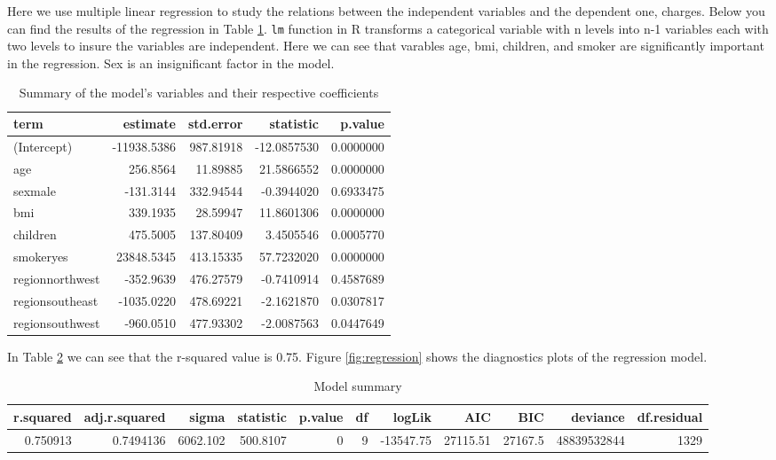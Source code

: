\documentclass[
]{article}
\begin{document}
Here we use multiple linear regression to study the relations between the independent variables and the dependent one, charges. Below you can find the results of the regression in Table \ref{tab:methods-tidy}. \texttt{lm} function in R transforms a categorical variable with n levels into n-1 variables each with two levels to insure the variables are independent. Here we can see that varables age, bmi, children, and smoker are significantly important in the regression. Sex is an insignificant factor in the model.

\begin{table}

\caption{\label{tab:methods-tidy}Summary of the model's variables and their respective coefficients}
\centering
\begin{tabular}[t]{l|r|r|r|r}
\hline
term & estimate & std.error & statistic & p.value\\
\hline
(Intercept) & -11938.5386 & 987.81918 & -12.0857530 & 0.0000000\\
\hline
age & 256.8564 & 11.89885 & 21.5866552 & 0.0000000\\
\hline
sexmale & -131.3144 & 332.94544 & -0.3944020 & 0.6933475\\
\hline
bmi & 339.1935 & 28.59947 & 11.8601306 & 0.0000000\\
\hline
children & 475.5005 & 137.80409 & 3.4505546 & 0.0005770\\
\hline
smokeryes & 23848.5345 & 413.15335 & 57.7232020 & 0.0000000\\
\hline
regionnorthwest & -352.9639 & 476.27579 & -0.7410914 & 0.4587689\\
\hline
regionsoutheast & -1035.0220 & 478.69221 & -2.1621870 & 0.0307817\\
\hline
regionsouthwest & -960.0510 & 477.93302 & -2.0087563 & 0.0447649\\
\hline
\end{tabular}
\end{table}

In Table \ref{tab:methods-glance} we can see that the r-squared value is 0.75. Figure \ref{fig:regression} shows the diagnostics plots of the regression model.

\begin{table}

\caption{\label{tab:methods-glance}Model summary}
\centering
\begin{tabular}[t]{r|r|r|r|r|r|r|r|r|r|r}
\hline
r.squared & adj.r.squared & sigma & statistic & p.value & df & logLik & AIC & BIC & deviance & df.residual\\
\hline
0.750913 & 0.7494136 & 6062.102 & 500.8107 & 0 & 9 & -13547.75 & 27115.51 & 27167.5 & 48839532844 & 1329\\
\hline
\end{tabular}
\end{table}
\end{document}
